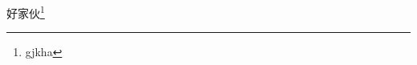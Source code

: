 \documentclass[a4paper,12pt]{ctexart}
\newcommand{\学年学期}{2020-2021学年第1学期}
\newcommand{\课程名称}{哈哈哈}
\newcommand{\论文题目}{哈哈哈哈哈哈哈}
\newcommand{\任课教师}{哈哈哈}
\newcommand{\系别}{哈哈哈}
\newcommand{\研究方向}{哈哈哈}
\newcommand{\姓名}{哈哈哈}
\newcommand{\年级}{2021}
\newcommand{\学号}{哈哈哈}
\newcommand{\完成时间}{哈哈哈}
\begin{document}
\makecoverpage
    
好家伙\footnote{gjkha}
\end{document}
